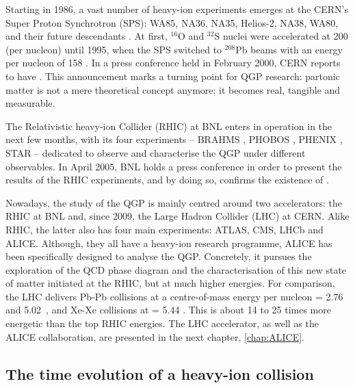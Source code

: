 Starting in 1986, a vast number of heavy-ion experiments emerges at the CERN's Super Proton Synchrotron (SPS): WA85, NA36, NA35, Helios-2, NA38, WA80, and their future descendants \cite{satzSPSHeavyIon2004}. At first, $^{16}$O and $^{32}$S nuclei were accelerated at 200 \gev (per nucleon) until 1995, when the SPS switched to $^{208}$Pb beams with an energy per nucleon of 158 \gev. In a press conference held in February 2000, CERN reports to have  \cite{cernNewStateMatter2023}. This announcement marks a turning point for QGP research: partonic matter is not a mere theoretical concept anymore; it becomes real, tangible and measurable.

The Relativistic heavy-ion Collider (RHIC) at BNL enters in operation in the next few months, with its four experiments -- BRAHMS \cite{arseneQuarkGluonPlasma2005}, PHOBOS \cite{backPHOBOSPerspectiveDiscoveries2005}, PHENIX \cite{phenixcollaborationFormationDensePartonic2005}, STAR \cite{starcollaborationExperimentalTheoreticalChallenges2005} -- dedicated to observe and characterise the QGP under different observables. In April 2005, BNL holds a press conference in order to present the results of the RHIC experiments, and by doing so, confirms the existence of  \cite{ludlamHUNTINGQUARKGLUON2005}.

Nowadays, the study of the QGP is mainly centred around two accelerators: the RHIC at BNL and, since 2009, the Large Hadron Collider (LHC) at CERN. Alike RHIC, the latter also has four main experiments: ATLAS, CMS, LHCb and ALICE. Although, they all have a heavy-ion research programme, ALICE has been specifically designed to analyse the QGP. Concretely, it pursues the exploration of the QCD phase diagram and the characterisation of this new state of matter initiated at the RHIC, but at much higher energies. For comparison, the LHC delivers Pb-Pb collisions at a centre-of-mass energy per nucleon \sqrtSnn = 2.76 and 5.02~\tev, and \mbox{Xe-Xe} collisions at \sqrtSnn = 5.44 \tev. This is about 14 to 25 times more energetic than the top RHIC energies. The LHC accelerator, as well as the ALICE collaboration, are presented in the next chapter, \chap\ref{chap:ALICE}.


\subsection{The time evolution of a heavy-ion collision}
\label{subsec:BjorkenScenario}

